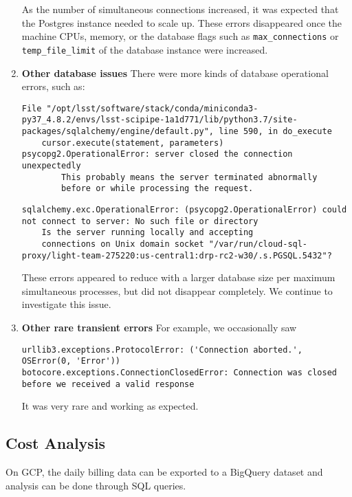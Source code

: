 \begin{enumerate}
As the number of simultaneous connections increased, it was expected that the Postgres instance needed to scale up.
These errors disappeared once the machine CPUs, memory, or the database flags such as \texttt{max\_connections} or \texttt{temp\_file\_limit} of the database instance were increased.

\item  \textbf{Other database issues}
There were more kinds of database operational errors, such as:

\begin{lstlisting}[style=basherror]
  File "/opt/lsst/software/stack/conda/miniconda3-py37_4.8.2/envs/lsst-scipipe-1a1d771/lib/python3.7/site-packages/sqlalchemy/engine/default.py", line 590, in do_execute
    cursor.execute(statement, parameters)
psycopg2.OperationalError: server closed the connection unexpectedly
        This probably means the server terminated abnormally
        before or while processing the request.
\end{lstlisting}

\begin{lstlisting}[style=basherror]
sqlalchemy.exc.OperationalError: (psycopg2.OperationalError) could not connect to server: No such file or directory
	Is the server running locally and accepting
	connections on Unix domain socket "/var/run/cloud-sql-proxy/light-team-275220:us-central1:drp-rc2-w30/.s.PGSQL.5432"?
\end{lstlisting}

These errors appeared to reduce with a larger database size per maximum simultaneous processes, but did not disappear completely.
We continue to investigate this issue.


\item  \textbf{Other rare transient errors}
For example, we occasionally saw
\begin{lstlisting}[style=basherror]
urllib3.exceptions.ProtocolError: ('Connection aborted.', OSError(0, 'Error'))
botocore.exceptions.ConnectionClosedError: Connection was closed before we received a valid response
\end{lstlisting}
It was very rare and working as expected.

\end{enumerate}


\subsection{Cost Analysis}
On GCP, the daily billing data can be exported to a BigQuery dataset and analysis can be done through SQL queries.

